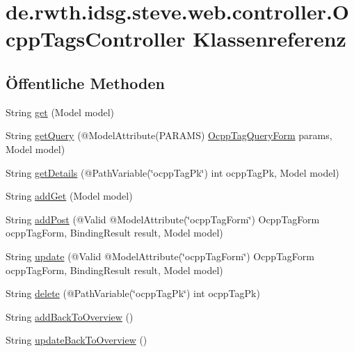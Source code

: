 \hypertarget{classde_1_1rwth_1_1idsg_1_1steve_1_1web_1_1controller_1_1_ocpp_tags_controller}{\section{de.\-rwth.\-idsg.\-steve.\-web.\-controller.\-Ocpp\-Tags\-Controller Klassenreferenz}
\label{classde_1_1rwth_1_1idsg_1_1steve_1_1web_1_1controller_1_1_ocpp_tags_controller}
}
\subsection*{Öffentliche Methoden}
\begin{DoxyCompactItemize}
\item 
String \hyperlink{classde_1_1rwth_1_1idsg_1_1steve_1_1web_1_1controller_1_1_ocpp_tags_controller_a602aac1d54ad517537aa6d125e2cf284}{get} (Model model)
\item 
String \hyperlink{classde_1_1rwth_1_1idsg_1_1steve_1_1web_1_1controller_1_1_ocpp_tags_controller_aecca093ee421371b813d589b6df11dba}{get\-Query} (@Model\-Attribute(P\-A\-R\-A\-M\-S) \hyperlink{classde_1_1rwth_1_1idsg_1_1steve_1_1web_1_1dto_1_1_ocpp_tag_query_form}{Ocpp\-Tag\-Query\-Form} params, Model model)
\item 
String \hyperlink{classde_1_1rwth_1_1idsg_1_1steve_1_1web_1_1controller_1_1_ocpp_tags_controller_a7a2426eb6471a684003b83785b7930fb}{get\-Details} (@Path\-Variable(\char`\"{}ocpp\-Tag\-Pk\char`\"{}) int ocpp\-Tag\-Pk, Model model)
\item 
String \hyperlink{classde_1_1rwth_1_1idsg_1_1steve_1_1web_1_1controller_1_1_ocpp_tags_controller_a1f69829f6693bfe33095eb6b4a1a8c23}{add\-Get} (Model model)
\item 
String \hyperlink{classde_1_1rwth_1_1idsg_1_1steve_1_1web_1_1controller_1_1_ocpp_tags_controller_a5bc4271fe36865deb5920394e3bcfd37}{add\-Post} (@Valid @Model\-Attribute(\char`\"{}ocpp\-Tag\-Form\char`\"{}) Ocpp\-Tag\-Form ocpp\-Tag\-Form, Binding\-Result result, Model model)
\item 
String \hyperlink{classde_1_1rwth_1_1idsg_1_1steve_1_1web_1_1controller_1_1_ocpp_tags_controller_a1590124b9a3b88ff00809b4668381542}{update} (@Valid @Model\-Attribute(\char`\"{}ocpp\-Tag\-Form\char`\"{}) Ocpp\-Tag\-Form ocpp\-Tag\-Form, Binding\-Result result, Model model)
\item 
String \hyperlink{classde_1_1rwth_1_1idsg_1_1steve_1_1web_1_1controller_1_1_ocpp_tags_controller_a27ab7046cf5d528c8d498da646735682}{delete} (@Path\-Variable(\char`\"{}ocpp\-Tag\-Pk\char`\"{}) int ocpp\-Tag\-Pk)
\item 
String \hyperlink{classde_1_1rwth_1_1idsg_1_1steve_1_1web_1_1controller_1_1_ocpp_tags_controller_a6d672cbefe4cdce451d57999a8e4b9ec}{add\-Back\-To\-Overview} ()
\item 
String \hyperlink{classde_1_1rwth_1_1idsg_1_1steve_1_1web_1_1controller_1_1_ocpp_tags_controller_a24b50fca3144465a1fd0ad743083c3aa}{update\-Back\-To\-Overview} ()
\end{DoxyCompactItemize}


